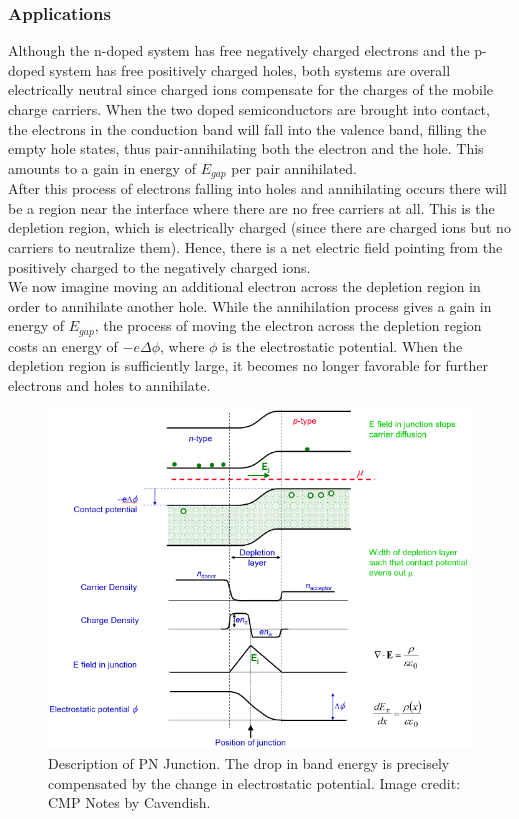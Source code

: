 \documentclass[a4paper]{article}
\begin{document}
\subsubsection*{Applications}
\begin{Note}[P-N Junctions]
Although the n-doped system has free negatively charged electrons and the p-doped system has free positively charged holes, both systems are overall electrically neutral since charged ions compensate for the charges of the mobile charge carriers. When the two doped semiconductors are brought into contact, the electrons in the conduction band will fall into the valence band, filling the empty hole states, thus pair-annihilating both the electron and the hole. This amounts to a gain in energy of $E_{gap}$ per pair annihilated.\\[5pt]
After this process of electrons falling into holes and annihilating occurs there will be a region near the interface where there are no free carriers at all. This is the depletion region, which is electrically charged (since there are charged ions but no carriers to neutralize them). Hence, there is a net electric field pointing from the positively charged to the negatively charged ions.\\[5pt]
We now imagine moving an additional electron across the depletion region in order to annihilate another hole. While the annihilation process gives a gain in energy of $E_{gap}$, the process of moving the electron across the depletion region costs an energy of $-e\Delta\phi$, where $\phi$ is the electrostatic potential. When the depletion region is sufficiently large, it becomes no longer favorable for further electrons and holes to annihilate. 
\end{Note}
\begin{figure}[H]
    \centering
    \includegraphics[width=\linewidth]{pnjunction.PNG}
    \caption{Description of PN Junction. The drop in band energy is precisely compensated by the change in electrostatic potential. Image credit: CMP Notes by Cavendish.}
\end{figure}
\end{document}
